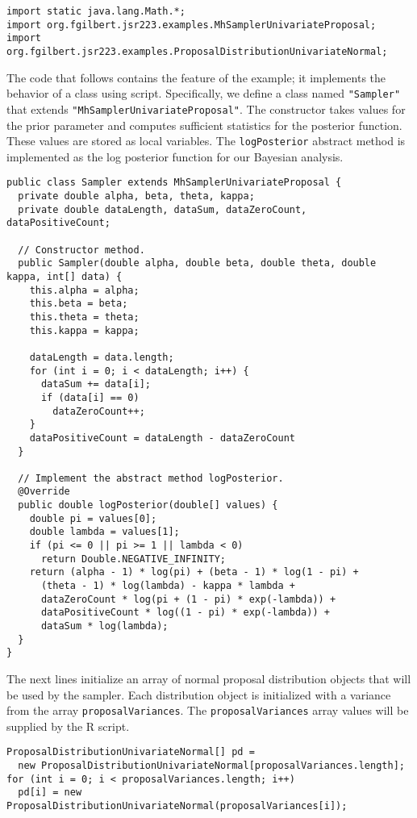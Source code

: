 \documentclass[
article,
11pt, %
a4paper, %
oneside, %
headinclude,footinclude, %
]{scrartcl}
\theoremstyle{definition} %
\theoremstyle{plain} %
\theoremstyle{remark} %
\newcommand{\code}[1]{\texttt{#1}}
\begin{document}
\begin{verbatim}
import static java.lang.Math.*;
import org.fgilbert.jsr223.examples.MhSamplerUnivariateProposal;
import org.fgilbert.jsr223.examples.ProposalDistributionUnivariateNormal;
\end{verbatim}

The code that follows contains the feature of the example; it implements the behavior of a class using script. Specifically, we define a class named \code{"Sampler"} that extends \code{"MhSamplerUnivariateProposal"}. The constructor takes values for the prior parameter and computes sufficient statistics for the posterior function. These values are stored as local variables. The \code{logPosterior} abstract method is implemented as the log posterior function for our Bayesian analysis.

\begin{verbatim}
public class Sampler extends MhSamplerUnivariateProposal {
  private double alpha, beta, theta, kappa;
  private double dataLength, dataSum, dataZeroCount, dataPositiveCount;

  // Constructor method.
  public Sampler(double alpha, double beta, double theta, double kappa, int[] data) {
    this.alpha = alpha;
    this.beta = beta;
    this.theta = theta;
    this.kappa = kappa;

    dataLength = data.length;
    for (int i = 0; i < dataLength; i++) {
      dataSum += data[i];
      if (data[i] == 0)
        dataZeroCount++;
    }
    dataPositiveCount = dataLength - dataZeroCount
  }

  // Implement the abstract method logPosterior.
  @Override
  public double logPosterior(double[] values) {
    double pi = values[0];
    double lambda = values[1];
    if (pi <= 0 || pi >= 1 || lambda < 0)
      return Double.NEGATIVE_INFINITY;
    return (alpha - 1) * log(pi) + (beta - 1) * log(1 - pi) +
      (theta - 1) * log(lambda) - kappa * lambda +
      dataZeroCount * log(pi + (1 - pi) * exp(-lambda)) +
      dataPositiveCount * log((1 - pi) * exp(-lambda)) +
      dataSum * log(lambda);
  }
}
\end{verbatim}

The next lines initialize an array of normal proposal distribution objects that will be used by the sampler. Each distribution object is initialized with a variance from the array \code{proposalVariances}. The \code{proposalVariances} array values will be supplied by the R script.
\begin{verbatim}
ProposalDistributionUnivariateNormal[] pd =
  new ProposalDistributionUnivariateNormal[proposalVariances.length];
for (int i = 0; i < proposalVariances.length; i++)
  pd[i]	= new ProposalDistributionUnivariateNormal(proposalVariances[i]);
\end{verbatim}
\end{document}
